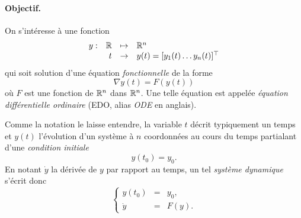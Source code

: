 

\paragraph*{Objectif.} 
On s'intéresse à une fonction 
$$
\begin{array}{rrcl}
  y : & \mathbb{R} & \mapsto & \mathbb{R}^n \\
  & t & \rightarrow & y(t) = [y_1(t) \dots y_n(t)]^\top 
\end{array}
$$
qui soit solution d'une équation {\em fonctionnelle} de la forme
$$
\nabla y(t) = F(y(t))
$$
où $F$ est une fonction de $\mathbb{R}^n$ dans $\mathbb{R}^n$. Une telle équation est appelée {\em équation différentielle ordinaire} (EDO, alias {\em ODE} en anglais).

Comme la notation le laisse entendre, la variable $t$ décrit typiquement un temps et $y(t)$ l'évolution d'un système à $n$ coordonnées au cours du temps partialant d'une {\em condition initiale}
$$
y(t_0) = y_0.
$$
En notant $\dot y$ la dérivée de $y$ par rapport au temps, un tel {\em système dynamique} s'écrit donc
$$
\left\{\begin{array}{rcl}
        y(t_0) & = & y_0, \\
        \dot y & = & F(y).
       \end{array}\right.
$$

